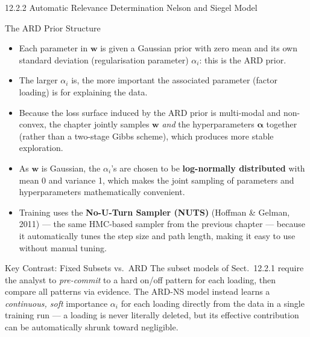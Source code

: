 \documentclass[aspectratio=169,10pt]{beamer}
\newcommand{\bw}{\mathbf{w}}
\newcommand{\balpha}{\bm{\alpha}}
\begin{document}
\begin{frame}[allowframebreaks]{12.2.2 Automatic Relevance Determination Nelson and Siegel Model}
\begin{block}{The ARD Prior Structure}
\begin{itemize}
  \item Each parameter in $\bw$ is given a Gaussian prior with zero mean and its own standard deviation (regularisation parameter) $\alpha_i$: this is the ARD prior.
  \item The larger $\alpha_i$ is, the more important the associated parameter (factor loading) is for explaining the data.
  \item Because the loss surface induced by the ARD prior is multi-modal and non-convex, the chapter jointly samples $\bw$ \emph{and} the hyperparameters $\balpha$ together (rather than a two-stage Gibbs scheme), which produces more stable exploration.
  \item As $\bw$ is Gaussian, the $\alpha_i$'s are chosen to be \textbf{log-normally distributed} with mean 0 and variance 1, which makes the joint sampling of parameters and hyperparameters mathematically convenient.
  \item Training uses the \textbf{No-U-Turn Sampler (NUTS)} (Hoffman \& Gelman, 2011) --- the same HMC-based sampler from the previous chapter --- because it automatically tunes the step size and path length, making it easy to use without manual tuning.
\end{itemize}
\end{block}

\begin{alertblock}{Key Contrast: Fixed Subsets vs.\ ARD}
The subset models of Sect.~12.2.1 require the analyst to \emph{pre-commit} to a hard on/off pattern for each loading, then compare all patterns via evidence. The ARD-NS model instead learns a \emph{continuous, soft} importance $\alpha_i$ for each loading directly from the data in a single training run --- a loading is never literally deleted, but its effective contribution can be automatically shrunk toward negligible.
\end{alertblock}

\end{frame}
\end{document}
